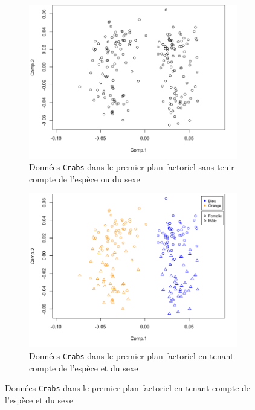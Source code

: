 \documentclass[a4paper,10pt]{report}
\begin{document}
\begin{figure}[H]
	\centering
	\captionsetup{justification=centering, margin=2cm}
	\caption{\small Représentation des données \texttt{Crabs} dans le premier plan factoriel après ACP}
	\begin{subfigure}[b]{0.5\linewidth}
		\centering
		\captionsetup{justification=centering, margin=1cm}
		\includegraphics[width=1\linewidth]{img/1-crabs-acp-premier-plan-factoriel}
		\caption{\small Données \texttt{Crabs} dans le premier plan factoriel sans tenir compte de l'espèce ou du sexe}
		\label{fig:1-crabs-acp-premier-plan-factoriel}
	\end{subfigure}%
	\begin{subfigure}[b]{0.5\linewidth}
		\centering
		\captionsetup{justification=centering, margin=1cm}
		\includegraphics[width=1\linewidth]{img/1-crabs-acp-premier-plan-factoriel-discr-species-and-sex}
		\caption{\small Données \texttt{Crabs} dans le premier plan factoriel en tenant compte de l'espèce et du sexe}
		\label{fig:1-crabs-acp-premier-plan-factoriel-discr-species-and-sex}
	\end{subfigure}%
	\label{fig:1-crabs-acp-representation-graphique}%
\end{figure}
\end{document}

